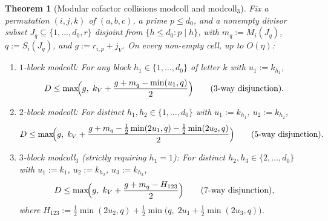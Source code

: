 \documentclass[11pt,a4paper]{amsart}
\theoremstyle{plain}
\newtheorem{theorem}{Theorem}[section]
\theoremstyle{definition}
\theoremstyle{remark}
\begin{document}
\begin{theorem}[Modular cofactor collisions \textsf{modcoll} and \textsf{modcoll}$_3$]\label{thm:modcoll}
Fix a permutation $(i,j,k)$ of $(a,b,c)$, a prime $p \le d_0$, and a nonempty divisor subset $J_q \subseteq \{1,\dots,d_0,r\}$ disjoint from $\{h \le d_0 : p \mid h\}$, with $m_q := M_i(J_q)$, $q := S_i(J_q)$, and $g := r_{i,p} + j_V$. On every non-empty cell, up to $O(\eta)$:
\begin{enumerate}[label=(\roman*)]
\item \emph{$1$-block \textsf{modcoll}:} For any block $h_1 \in \{1,\dots,d_0\}$ of letter $k$ with $u_1 := k_{h_1}$,
\[
  D \le \max\!\Bigl(g,\; k_V + \frac{g + m_q - \min(u_1, q)}{2}\Bigr) \qquad (\text{3-way disjunction}).
\]
\item \emph{$2$-block \textsf{modcoll}:} For distinct $h_1, h_2 \in \{1,\dots,d_0\}$ with $u_1 := k_{h_1}$, $u_2 := k_{h_2}$,
\[
  D \le \max\!\Bigl(g,\; k_V + \frac{g + m_q - \frac{1}{2}\min(2 u_1, q) - \frac{1}{2}\min(2 u_2, q)}{2}\Bigr) \qquad (\text{5-way disjunction}).
\]
\item \emph{$3$-block \textsf{modcoll}$_3$ (strictly requiring $h_1 = 1$):} For distinct $h_2, h_3 \in \{2,\dots,d_0\}$ with $u_1 := k_1$, $u_2 := k_{h_2}$, $u_3 := k_{h_3}$,
\[
  D \le \max\!\Bigl(g,\; k_V + \frac{g + m_q - H_{123}}{2}\Bigr) \qquad (\text{7-way disjunction}),
\]
where $H_{123} := \frac{1}{2}\min(2 u_2, q) + \frac{1}{2}\min\bigl(q,\; 2 u_1 + \frac{1}{2}\min(2 u_3, q)\bigr)$.
\end{enumerate}
\end{theorem}
\end{document}
